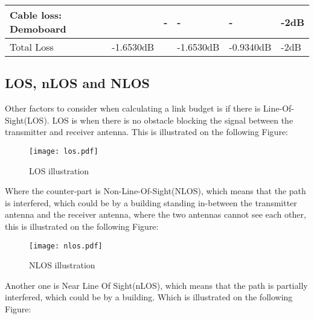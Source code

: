 \begin{table}[H]
\begin{tabular}{|l|l|l|l|l|l|}
Cable loss: Demoboard                                                       &                                                          & -                                                       & -                                                        & -                                                       & -2dB                                                          \\ \hline
Total Loss                                                                  & -1.6530dB                                                &                                                         & -1.6530dB                                                 & -0.9340dB                                              & -2dB                                                          \\ \hline
\end{tabular}
\end{table}



\subsection{LOS, nLOS and NLOS}

Other factors to consider when calculating a link budget is if there is Line-Of-Sight(LOS). LOS is when there is no obstacle blocking the signal between the transmitter and receiver antenna. This is illustrated on the following Figure:

\begin{figure}[H]
\centering
\texttt{[image: los.pdf]}
\caption{LOS illustration}
\label{LOS}
\end{figure}  


Where the counter-part is Non-Line-Of-Sight(NLOS), which means that the path is interfered, which could be by a building standing in-between the transmitter antenna and the receiver antenna, where the two antennas cannot see each other, this is illustrated on the following Figure: 

\begin{figure}[H]
\centering
\texttt{[image: nlos.pdf]}
\caption{NLOS illustration}
\label{dijdkkfkfddd}
\end{figure} 

Another one is Near Line Of Sight(nLOS), which means that the path is partially interfered,  which could be by a building. Which is illustrated on the following Figure:

